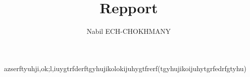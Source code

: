 \documentclass[10pt,a4paper]{article}
\title{Repport}
\author{Nabil ECH-CHOKHMANY}
\begin{document}
	\maketitle
	azserftyuhji,ok;l,iuygtrfderftgyhujikolokijuhygtfrerf(tgyhujikoijuhytgrfedrfgtyhu)
\end{document}
